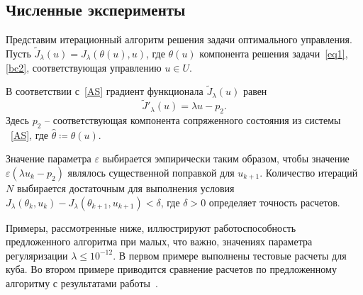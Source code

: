 \subsection{Численные эксперименты}\label{subsec:ch4}

Представим итерационный алгоритм решения задачи оптимального управления.
Пусть $\tilde J_\lambda(u)=J_\lambda(\theta(u), u)$, где $\theta(u)$ компонента решения
задачи~\eqref{eq1},\eqref{bc2}, соответствующая управлению $u\in U$.

В соответствии с~\eqref{AS} градиент функционала $\tilde J_\lambda(u)$ равен
\[ \tilde J'_\lambda (u) = \lambda u - p_2. \]
Здесь $p_2$ -- соответствующая компонента сопряженного состояния из системы ~\eqref{AS},
где $\hat{\theta}\coloneqq\theta(u)$.

Значение параметра $\varepsilon$ выбирается эмпирически таким образом, чтобы значение
$\varepsilon (\lambda u_k - p_2)$ являлось существенной поправкой для $u_{k+1}$.
Количество итераций $N$ выбирается достаточным для выполнения условия
$J_\lambda(\theta_k, u_k) - J_\lambda(\theta_{k+1}, u_{k+1}) < \delta$, где $\delta>0$
определяет точность расчетов.

Примеры, рассмотренные ниже, иллюстрируют работоспособность предложенного алгоритма при
малых, что важно, значениях параметра регуляризации $\lambda \leq 10^{-12}$.
В первом примере выполнены тестовые расчеты для куба.
Во втором примере приводится сравнение расчетов по
предложенному алгоритму с результатами работы~\cite{CNSNS19}.

